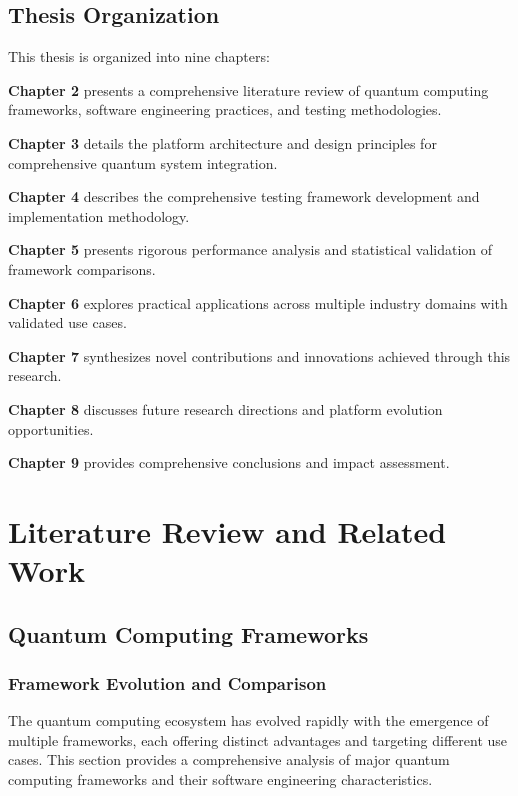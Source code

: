 \documentclass[12pt,a4paper]{report}
\begin{document}
\section{Thesis Organization}

This thesis is organized into nine chapters:

\textbf{Chapter 2} presents a comprehensive literature review of quantum computing frameworks, software engineering practices, and testing methodologies.

\textbf{Chapter 3} details the platform architecture and design principles for comprehensive quantum system integration.

\textbf{Chapter 4} describes the comprehensive testing framework development and implementation methodology.

\textbf{Chapter 5} presents rigorous performance analysis and statistical validation of framework comparisons.

\textbf{Chapter 6} explores practical applications across multiple industry domains with validated use cases.

\textbf{Chapter 7} synthesizes novel contributions and innovations achieved through this research.

\textbf{Chapter 8} discusses future research directions and platform evolution opportunities.

\textbf{Chapter 9} provides comprehensive conclusions and impact assessment.

\chapter{Literature Review and Related Work}

\section{Quantum Computing Frameworks}

\subsection{Framework Evolution and Comparison}

The quantum computing ecosystem has evolved rapidly with the emergence of multiple frameworks, each offering distinct advantages and targeting different use cases. This section provides a comprehensive analysis of major quantum computing frameworks and their software engineering characteristics.
\end{document}
